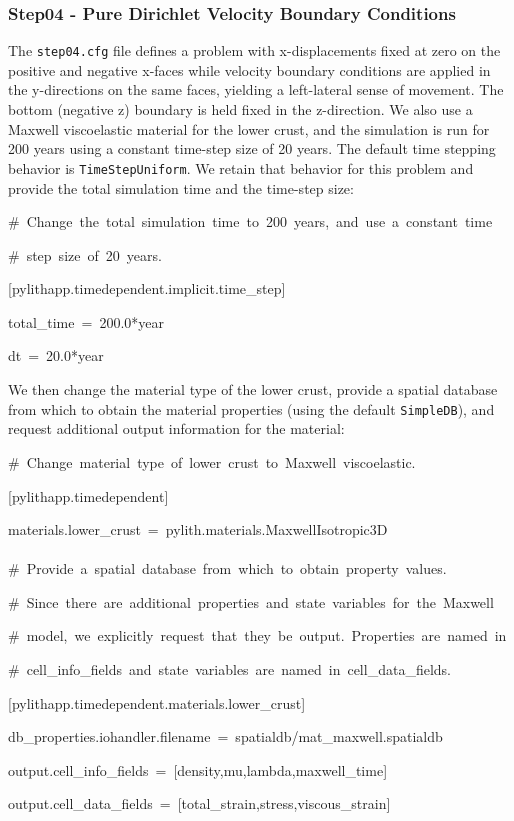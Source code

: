 \subsubsection{Step04 - Pure Dirichlet Velocity Boundary Conditions}

The \texttt{step04.cfg} file defines a problem with x-displacements
fixed at zero on the positive and negative x-faces while velocity
boundary conditions are applied in the y-directions on the same faces,
yielding a left-lateral sense of movement. The bottom (negative z)
boundary is held fixed in the z-direction. We also use a Maxwell viscoelastic
material for the lower crust, and the simulation is run for 200 years
using a constant time-step size of 20 years. The default time stepping
behavior is \texttt{TimeStepUniform}. We retain that behavior for
this problem and provide the total simulation time and the time-step
size:
\begin{lyxcode}
\#~Change~the~total~simulation~time~to~200~years,~and~use~a~constant~time

\#~step~size~of~20~years.

{[}pylithapp.timedependent.implicit.time\_step{]}

total\_time~=~200.0{*}year

dt~=~20.0{*}year~
\end{lyxcode}
We then change the material type of the lower crust, provide a spatial
database from which to obtain the material properties (using the default
\texttt{SimpleDB}), and request additional output information for
the material:
\begin{lyxcode}
\#~Change~material~type~of~lower~crust~to~Maxwell~viscoelastic.

{[}pylithapp.timedependent{]}

materials.lower\_crust~=~pylith.materials.MaxwellIsotropic3D~\\
~\\


\#~Provide~a~spatial~database~from~which~to~obtain~property~values.

\#~Since~there~are~additional~properties~and~state~variables~for~the~Maxwell

\#~model,~we~explicitly~request~that~they~be~output.~Properties~are~named~in

\#~cell\_info\_fields~and~state~variables~are~named~in~cell\_data\_fields.

{[}pylithapp.timedependent.materials.lower\_crust{]}

db\_properties.iohandler.filename~=~spatialdb/mat\_maxwell.spatialdb

output.cell\_info\_fields~=~{[}density,mu,lambda,maxwell\_time{]}

output.cell\_data\_fields~=~{[}total\_strain,stress,viscous\_strain{]}
\end{lyxcode}
